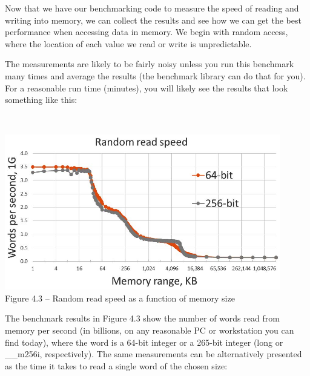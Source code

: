
Now that we have our benchmarking code to measure the speed of reading and writing into memory, we can collect the results and see how we can get the best performance when accessing data in memory. We begin with random access, where the location of each value we read or write is unpredictable.




The measurements are likely to be fairly noisy unless you run this benchmark many times and average the results (the benchmark library can do that for you). For a reasonable run time (minutes), you will likely see the results that look something like this:

\hspace*{\fill} \\ %
\begin{center}
\includegraphics[width=0.9\textwidth]{content/1/chapter4/images/3.jpg}\\
Figure 4.3 – Random read speed as a function of memory size
\end{center}

The benchmark results in Figure 4.3 show the number of words read from memory per second (in billions, on any reasonable PC or workstation you can find today), where the word is a 64-bit integer or a 265-bit integer (long or \_\_m256i, respectively). The same measurements can be alternatively presented as the time it takes to read a single word of the chosen size:

